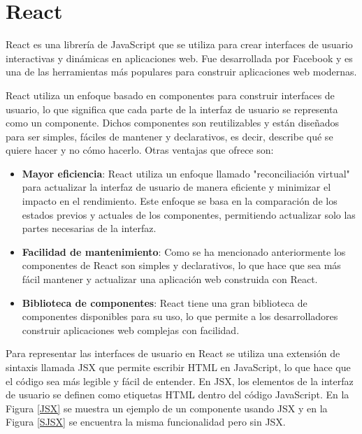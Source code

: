 \section{React}\label{sec:React}
React es una librería de JavaScript que se utiliza para crear interfaces de usuario interactivas y dinámicas en aplicaciones web. Fue desarrollada por Facebook y es una de las herramientas más populares para construir aplicaciones web modernas.

React utiliza un enfoque basado en componentes para construir interfaces de usuario, lo que significa que cada parte de la interfaz de usuario se representa como un componente. Dichos componentes son reutilizables y están diseñados para ser simples, fáciles de mantener y declarativos, es decir, describe qué se quiere hacer y no cómo hacerlo. Otras ventajas que ofrece son:

\begin{itemize}
    \item \textbf{Mayor eficiencia}: React utiliza un enfoque llamado "reconciliación virtual" para actualizar la interfaz de usuario de manera eficiente y minimizar el impacto en el rendimiento. Este enfoque se basa en la comparación de los estados previos y actuales de los componentes, permitiendo actualizar solo las partes necesarias de la interfaz.
    \item \textbf{Facilidad de mantenimiento}: Como se ha mencionado anteriormente los componentes de React son simples y declarativos, lo que hace que sea más fácil mantener y actualizar una aplicación web construida con React.
   \item \textbf{Biblioteca de componentes}: React tiene una gran biblioteca de componentes disponibles para su uso, lo que permite a los desarrolladores construir aplicaciones web complejas con facilidad.
\end{itemize}

Para representar las interfaces de usuario en React se utiliza una extensión de sintaxis llamada JSX que permite escribir HTML en JavaScript, lo que hace que el código sea más legible y fácil de entender. En JSX, los elementos de la interfaz de usuario se definen como etiquetas HTML dentro del código JavaScript. En la Figura \ref{JSX} se muestra un ejemplo de un componente usando JSX y en la Figura \ref{SJSX} se encuentra la misma funcionalidad pero sin JSX.

